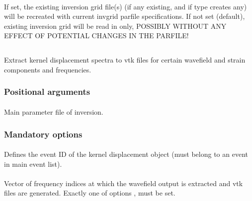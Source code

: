 \paragraph{}
If set, the existing inversion grid file(s) (if any existing, and if type creates any) will be recreated with 
current invgrid parfile specifications. If not set (default), existing inversion grid will be read in only, 
POSSIBLY WITHOUT ANY EFFECT OF POTENTIAL CHANGES IN THE PARFILE!
%
%
\subsection{} \label{programs_scripts,sec:bin_prog,sec:kdispl_2_vtk}
Extract kernel displacement spectra to vtk files for certain wavefield and strain components and frequencies.
\subsubsection{Positional arguments}
\paragraph{}
Main parameter file of inversion.
\subsubsection{Mandatory options}
\paragraph{ }
Defines the event ID of the kernel displacement object (must belong to an event in main event list).
\paragraph{}
Vector of  frequency indices at which the wavefield output is extracted and 
vtk files are generated. Exactly one of options  ,  must be set.

